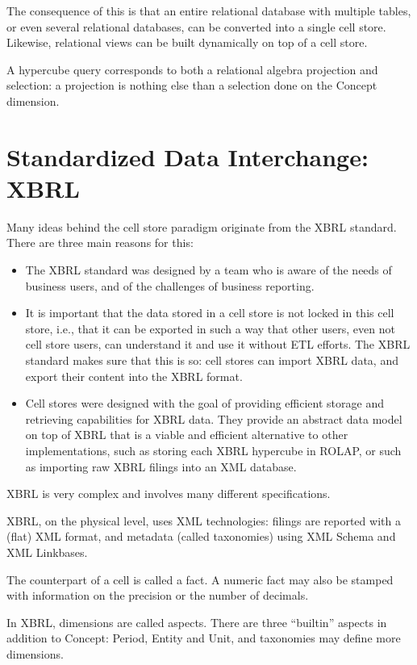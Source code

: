 \documentclass{vldb}
\begin{document}
The consequence of this is that an entire relational database with multiple tables, or even several relational databases, can be converted into a single cell store. Likewise, relational views can be built dynamically on top of a cell store.

A hypercube query corresponds to both a relational algebra projection and selection: a projection is nothing else than a selection done on the Concept dimension.

\section{Standardized Data Interchange: XBRL}

Many ideas behind the cell store paradigm originate from the XBRL standard. There are three main reasons for this:

\begin{itemize}
\item The XBRL standard was designed by a team who is aware of the needs of business users, and of the challenges of business reporting.
\item It is important that the data stored in a cell store is not locked in this cell store, i.e., that it can be exported in such a way that other users, even not cell store users, can understand it and use it without ETL efforts. The XBRL standard makes sure that this is so: cell stores can import XBRL data, and export their content into the XBRL format.
\item Cell stores were designed with the goal of providing efficient storage and retrieving capabilities for XBRL data. They provide an abstract data model on top of XBRL that is a viable and efficient alternative to other implementations, such as storing each XBRL hypercube in ROLAP, or such as importing raw XBRL filings into an XML database.
\end{itemize}

XBRL is very complex and involves many different specifications.

XBRL, on the physical level, uses XML technologies: filings are reported with a (flat) XML format, and metadata (called taxonomies) using XML Schema and XML Linkbases.

The counterpart of a cell is called a fact. A numeric fact may also be stamped with information on the precision or the number of decimals.

In XBRL, dimensions are called aspects. There are three ``builtin'' aspects in addition to Concept: Period, Entity and Unit, and taxonomies may define more dimensions.
\end{document}

